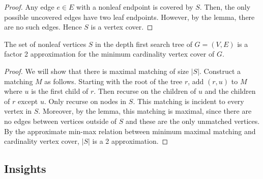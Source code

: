 \documentclass{article}
\begin{document}
\begin{proof}
    Any edge $e \in E$ with a nonleaf endpoint is covered by $S$. Then, the only 
    possible uncovered edges have two leaf endpoints. However, by the lemma, there are
    no such edges. Hence $S$ is a vertex cover. 
\end{proof}

\begin{theorem*}
    The set of nonleaf vertices $S$ in the depth first search tree of $G = (V, E)$ is a 
    factor 2 approximation for the minimum cardinality vertex cover of $G$.
\end{theorem*}

\begin{proof}
    We will show that there is maximal matching of size $|S|$. Construct a matching $M$
    as follows. Starting with the root of the tree $r$, add $(r, u)$ to $M$ where $u$ is
    the first child of $r$. Then recurse on the children of $u$ and the children of $r$
    except $u$. Only recurse on nodes in $S$. This matching is incident to every vertex
    in $S$. Moreover, by the lemma, this matching is maximal, since there are no edges
    between vertices outside of $S$ and these are the only unmatched vertices. \\

    By the approximate min-max relation between minimum maximal matching and cardinality
    vertex cover, $|S|$ is a 2 approximation.
\end{proof}

\subsection*{Insights}
\end{document}
